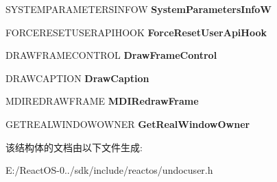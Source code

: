 \begin{DoxyCompactItemize}
\item 
\mbox{\label{structtag_u_s_e_r_a_p_i_h_o_o_k_a73ef287f4705edbc74690051505a6770}} 
S\+Y\+S\+T\+E\+M\+P\+A\+R\+A\+M\+E\+T\+E\+R\+S\+I\+N\+F\+OW {\bfseries System\+Parameters\+InfoW}
\item 
\mbox{\label{structtag_u_s_e_r_a_p_i_h_o_o_k_a3cf94681d6784fdf5dfa42adb401024b}} 
F\+O\+R\+C\+E\+R\+E\+S\+E\+T\+U\+S\+E\+R\+A\+P\+I\+H\+O\+OK {\bfseries Force\+Reset\+User\+Api\+Hook}
\item 
\mbox{\label{structtag_u_s_e_r_a_p_i_h_o_o_k_a887221ca440dd5cb66396abf28f94690}} 
D\+R\+A\+W\+F\+R\+A\+M\+E\+C\+O\+N\+T\+R\+OL {\bfseries Draw\+Frame\+Control}
\item 
\mbox{\label{structtag_u_s_e_r_a_p_i_h_o_o_k_af02d23299a60d0e6fcdca56597608e63}} 
D\+R\+A\+W\+C\+A\+P\+T\+I\+ON {\bfseries Draw\+Caption}
\item 
\mbox{\label{structtag_u_s_e_r_a_p_i_h_o_o_k_aa9689628a293217ee797f9fa7f06dccb}} 
M\+D\+I\+R\+E\+D\+R\+A\+W\+F\+R\+A\+ME {\bfseries M\+D\+I\+Redraw\+Frame}
\item 
\mbox{\label{structtag_u_s_e_r_a_p_i_h_o_o_k_a297974eb35454038a6f1df19680b6387}} 
G\+E\+T\+R\+E\+A\+L\+W\+I\+N\+D\+O\+W\+O\+W\+N\+ER {\bfseries Get\+Real\+Window\+Owner}
\end{DoxyCompactItemize}


该结构体的文档由以下文件生成\+:\begin{DoxyCompactItemize}
\item 
E\+:/\+React\+O\+S-\/0../sdk/include/reactos/undocuser.\+h\end{DoxyCompactItemize}
